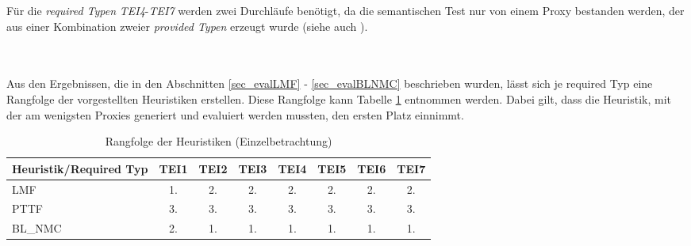 \begin{multicols}{2}
\columnbreak
{}
\end{multicols}
\begin{multicols}{2}
\columnbreak
{}
\end{multicols}
\begin{multicols}{2}
\columnbreak
{}
\end{multicols}
\noindent
Für die \emph{required Typen} \emph{TEI4}-\emph{TEI7} werden zwei Durchläufe benötigt, da die semantischen Test nur von einem Proxy bestanden werden, der aus einer Kombination zweier \emph{provided Typen} erzeugt wurde (siehe auch ).




\noindent
\\\\
Aus den Ergebnissen, die in den Abschnitten \ref{sec_evalLMF} - \ref{sec_evalBLNMC} beschrieben wurden, lässt sich je required Typ eine Rangfolge der vorgestellten Heuristiken erstellen. Diese Rangfolge kann Tabelle \ref{tab_rankingSingle} entnommen werden. Dabei gilt, dass die Heuristik, mit der am wenigsten Proxies generiert und evaluiert werden mussten, den ersten Platz einnimmt. 
\begin{table}[!h]
\centering
\begin{tabular}{|l|c|c|c|c|c|c|c|}
\hline
\hline
\textbf{Heuristik/Required Typ} & \textbf{TEI1} & \textbf{TEI2}& \textbf{TEI3}& \textbf{TEI4}& \textbf{TEI5}& \textbf{TEI6}& \textbf{TEI7}\\
\hline
\hline
LMF  &1.&2.&2.&2.&2.&2.&2.\\
\hline
PTTF  &3. &3.&3.&3.&3.&3.&3. \\
\hline
BL\_NMC & 2. &1. &1. &1. &1.&1.&1.\\
\hline
\hline
\end{tabular}
\caption{Rangfolge der Heuristiken (Einzelbetrachtung)}
\label{tab_rankingSingle}
\end{table}


